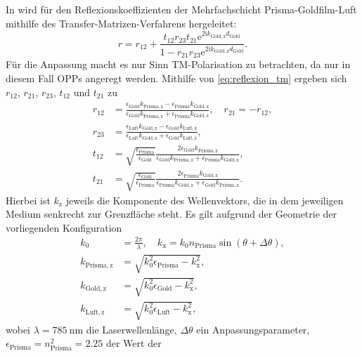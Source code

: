 In \cite{nano} wird für den Reflexionskoeffizienten der Mehrfachschicht Prisma-Goldfilm-Luft mithilfe
des Transfer-Matrizen-Verfahrens hergeleitet:
\begin{equation}\label{eq:wichtiger_reflexionskoeffizient}
    r = r_{12} + \frac{t_{12}r_{23}t_{21}\mathrm{e}^{2 \mathrm{i} k_{\mathrm{Gold,z}} d_{\mathrm{Gold}}}}{1 - r_{21}r_{23}\mathrm{e}^{2 \mathrm{i} k_{\mathrm{Gold,z}} d_{\mathrm{Gold}}}} .
\end{equation} Für die Anpassung macht es nur Sinn TM-Polarisation zu betrachten, da nur in diesem Fall OPPs angeregt werden. Mithilfe von \cref{eq:reflexion_tm} ergeben sich
$r_{12}$, $r_{21}$, $r_{23}$, $t_{12}$ und $t_{21}$ zu
\begin{align*}
    r_{12} &= \frac{\epsilon_{\mathrm{Gold}} k_{\mathrm{Prisma,z}} - \epsilon_{\mathrm{Prisma}} k_{\mathrm{Gold,z}}}{\epsilon_{\mathrm{Gold}} k_{\mathrm{Prisma,z}} + \epsilon_{\mathrm{Prisma}} k_{\mathrm{Gold,z}}} , \quad r_{21} = -r_{12} , \\
    r_{23} &= \frac{\epsilon_{\mathrm{Luft}} k_{\mathrm{Gold,z}} - \epsilon_{\mathrm{Gold}} k_{\mathrm{Luft,z}}}{\epsilon_{\mathrm{Luft}} k_{\mathrm{Gold,z}} + \epsilon_{\mathrm{Gold}} k_{\mathrm{Luft,z}}} , \\
    t_{12} &= \sqrt{\frac{\epsilon_{\mathrm{Prisma}}}{\epsilon_{\mathrm{Gold}}}} \frac{2 \epsilon_{\mathrm{Gold}} k_{\mathrm{Prisma,z}}}{\epsilon_{\mathrm{Gold}} k_{\mathrm{Prisma,z}} + \epsilon_{\mathrm{Prisma}} k_{\mathrm{Gold,z}}} , \\
    t_{21} &= \sqrt{\frac{\epsilon_{\mathrm{Gold}}}{\epsilon_{\mathrm{Prisma}}}} \frac{2 \epsilon_{\mathrm{Prisma}} k_{\mathrm{Gold,z}}}{\epsilon_{\mathrm{Prisma}} k_{\mathrm{Gold,z}} + \epsilon_{\mathrm{Gold}} k_{\mathrm{Prisma,z}}} .
\end{align*} Hierbei ist $k_{\mathrm{z}}$ jeweils die Komponente des Wellenvektors, die in dem jeweiligen Medium senkrecht zur Grenzfläche steht. Es gilt aufgrund der Geometrie der vorliegenden Konfiguration
\begin{align*}
    k_0 &= \frac{2\pi}{\lambda} , \quad k_{\mathrm{x}} = k_0 n_{\mathrm{Prisma}} \sin(\theta + \Delta \theta) , \\
    k_{\mathrm{Prisma,z}} &= \sqrt{k_0^2 \epsilon_{\mathrm{Prisma}} - k_{\mathrm{x}}^2} , \\
    k_{\mathrm{Gold,z}} &= \sqrt{k_0^2 \epsilon_{\mathrm{Gold}} - k_{\mathrm{x}}^2} , \\
    k_{\mathrm{Luft,z}} &= \sqrt{k_0^2 \epsilon_{\mathrm{Luft}} - k_{\mathrm{x}}^2} ,
\end{align*} wobei $\lambda = \SI{785}{\nm}$ die Laserwellenlänge, $\Delta \theta$ ein Anpassungsparameter, $\epsilon_{\mathrm{Prisma}} = n_{\mathrm{Prisma}}^2 = \num{2,25}$ der Wert der
